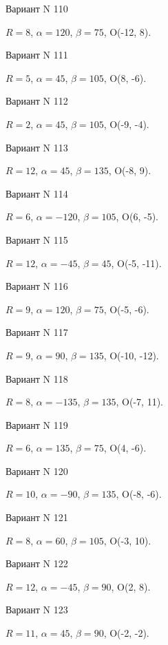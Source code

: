 \documentclass[11pt]{report}
\begin{document}
Вариант N 110

$R = 8$, $\alpha = 120$, $\beta = 75$, O(-12, 8).



Вариант N 111

$R = 5$, $\alpha = 45$, $\beta = 105$, O(8, -6).



Вариант N 112

$R = 2$, $\alpha = 45$, $\beta = 105$, O(-9, -4).



Вариант N 113

$R = 12$, $\alpha = 45$, $\beta = 135$, O(-8, 9).



Вариант N 114

$R = 6$, $\alpha = -120$, $\beta = 105$, O(6, -5).



Вариант N 115

$R = 12$, $\alpha = -45$, $\beta = 45$, O(-5, -11).



Вариант N 116

$R = 9$, $\alpha = 120$, $\beta = 75$, O(-5, -6).



Вариант N 117

$R = 9$, $\alpha = 90$, $\beta = 135$, O(-10, -12).



Вариант N 118

$R = 8$, $\alpha = -135$, $\beta = 135$, O(-7, 11).



Вариант N 119

$R = 6$, $\alpha = 135$, $\beta = 75$, O(4, -6).



Вариант N 120

$R = 10$, $\alpha = -90$, $\beta = 135$, O(-8, -6).



Вариант N 121

$R = 8$, $\alpha = 60$, $\beta = 105$, O(-3, 10).



Вариант N 122

$R = 12$, $\alpha = -45$, $\beta = 90$, O(2, 8).



Вариант N 123

$R = 11$, $\alpha = 45$, $\beta = 90$, O(-2, -2).
\end{document}
